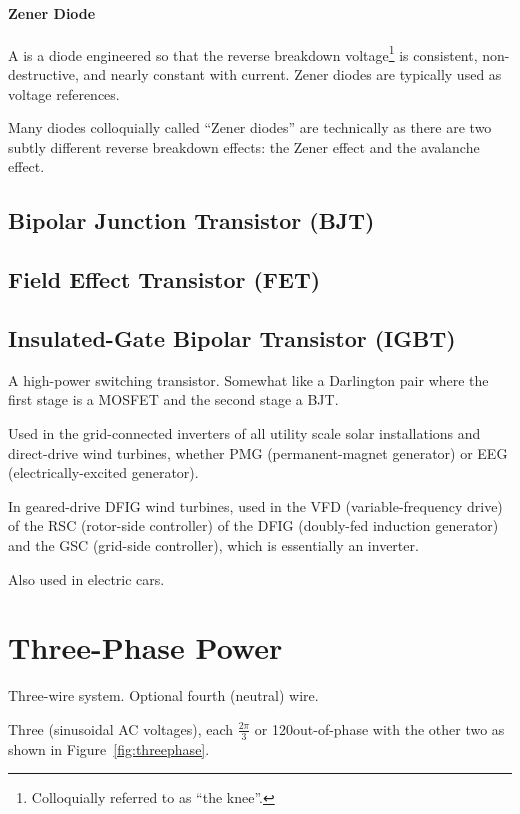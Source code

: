 \documentclass[11pt]{article}
\begin{document}
\paragraph{Zener Diode}

A  is a diode engineered so that the reverse
breakdown voltage\footnote{Colloquially referred to as ``the knee''.}
is consistent, non-destructive, and nearly constant with
current. Zener diodes are typically used as voltage references.

Many diodes colloquially called ``Zener diodes'' are technically
 as there are two subtly different reverse
breakdown effects: the Zener effect and the avalanche effect.


\subsection{Bipolar Junction Transistor (BJT)}


\subsection{Field Effect Transistor (FET)}


\subsection{Insulated-Gate Bipolar Transistor (IGBT)}

A high-power switching transistor. Somewhat like a Darlington pair
where the first stage is a MOSFET and the second stage a BJT.

Used in the grid-connected inverters of all utility scale solar
installations and direct-drive wind turbines, whether PMG
(permanent-magnet generator) or EEG (electrically-excited generator).

In geared-drive DFIG wind turbines, used in the VFD
(variable-frequency drive) of the RSC (rotor-side controller) of the
DFIG (doubly-fed induction generator) and the GSC (grid-side
controller), which is essentially an inverter.

Also used in electric cars.


\section{Three-Phase Power}

Three-wire system. Optional fourth (neutral) wire.

Three  (sinusoidal AC voltages), each $\frac{2\pi}{3}$ or
120\deg out-of-phase with the other two as shown in
Figure~\ref{fig:threephase}.
\end{document}
